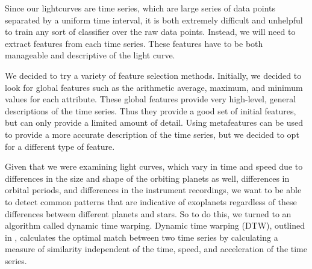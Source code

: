 \documentclass{amsart}
\begin{document}
Since our lightcurves are time series, which are large series of data points separated by a uniform time interval, it is both extremely difficult and unhelpful to train any sort of classifier over the raw data points. Instead, we will need to extract features from each time series. These features have to be both manageable and descriptive of the light curve.


We decided to try a variety of feature selection methods. Initially, we decided to look for global features such as the arithmetic average, maximum, and minimum values for each attribute. These global features provide very high-level, general descriptions of the time series. Thus they provide a good set of initial features, but can only provide a limited amount of detail. Using metafeatures can be used to provide a more accurate description of the time series, but we decided to opt for a different type of feature.

Given that we were examining light curves, which vary in time and speed due to differences in the size and shape of the orbiting planets as well, differences in orbital periods, and differences in the instrument recordings, we want to be able to detect common patterns that are indicative of exoplanets regardless of these differences between different planets and stars. So to do this, we turned to an algorithm called dynamic time warping. Dynamic time warping (DTW), outlined in \cite{dtw}, calculates the optimal match between two time series by calculating a measure of similarity independent of the time, speed, and acceleration of the time series. 
\end{document}
